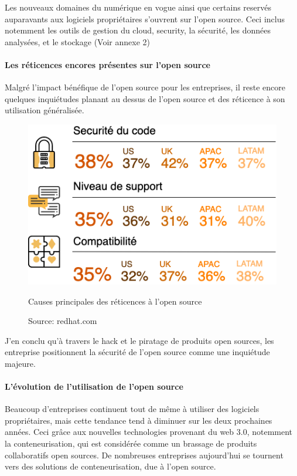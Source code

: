 					Les nouveaux domaines du numérique en vogue ainsi que certains reservés auparavants aux logiciels propriétaires s'ouvrent sur l'open source. Ceci inclus notemment les outils de gestion du cloud, security, la sécurité, les données analysées, et le stockage (Voir annexe 2)

				\clearpage
				\paragraph{Les réticences encores présentes sur l'open source\\}

					Malgré l'impact bénéfique de l'open source pour les entreprises, il reste encore quelques inquiétudes planant au dessus de l'open source et des réticence à son utilisation généralisée.

					\begin{figure}[!htb]
						\center
						\includegraphics[scale=0.70]{./img/Barreer_os.png}
						\caption{Causes principales des réticences à l'open source}
						\caption*{\color{silver}Source: redhat.com}					
					\end{figure}										

					J'en conclu qu'à travers le hack et le piratage de produits open sources, les entreprise positionnent la sécurité de l'open source comme une inquiétude majeure.

				\paragraph{L'évolution de l'utilisation de l'open source\\}

					Beaucoup d'entreprises continuent tout de même à utiliser des logiciels propriétaires, mais cette tendance tend à diminuer sur les deux prochaines années. Ceci grâce aux nouvelles technologies provenant du \gls{web 3.0}, notemment la \gls{conteneurisation}, qui est considérée comme un brassage de produits collaboratifs open sources. De nombreuses entreprises aujourd'hui se tournent vers des solutions de conteneurisation, due à l'open source.
					
